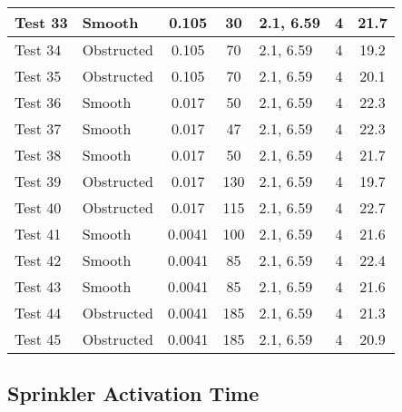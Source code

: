 \begin{table}[!ht]
\begin{center}
\begin {tabular}{|l|l|c|c|l|c|c|}
Test 33    &  Smooth        &  0.105            &  30               &  2.1, 6.59  &  4              &  21.7              \\ \hline
Test 34    &  Obstructed    &  0.105            &  70               &  2.1, 6.59  &  4              &  19.2              \\ \hline
Test 35    &  Obstructed    &  0.105            &  70               &  2.1, 6.59  &  4              &  20.1              \\ \hline
Test 36    &  Smooth        &  0.017            &  50               &  2.1, 6.59  &  4              &  22.3              \\ \hline
Test 37    &  Smooth        &  0.017            &  47               &  2.1, 6.59  &  4              &  22.3              \\ \hline
Test 38    &  Smooth        &  0.017            &  50               &  2.1, 6.59  &  4              &  21.7              \\ \hline
Test 39    &  Obstructed    &  0.017            &  130              &  2.1, 6.59  &  4              &  19.7              \\ \hline
Test 40    &  Obstructed    &  0.017            &  115              &  2.1, 6.59  &  4              &  22.7              \\ \hline
Test 41    &  Smooth        &  0.0041           &  100              &  2.1, 6.59  &  4              &  21.6              \\ \hline
Test 42    &  Smooth        &  0.0041           &  85               &  2.1, 6.59  &  4              &  22.4              \\ \hline
Test 43    &  Smooth        &  0.0041           &  85               &  2.1, 6.59  &  4              &  21.6              \\ \hline
Test 44    &  Obstructed    &  0.0041           &  185              &  2.1, 6.59  &  4              &  21.3              \\ \hline
Test 45    &  Obstructed    &  0.0041           &  185              &  2.1, 6.59  &  4              &  20.9              \\ \hline
\end{tabular}
\end{center}
\end{table}


\clearpage


\subsection*{Sprinkler Activation Time}

